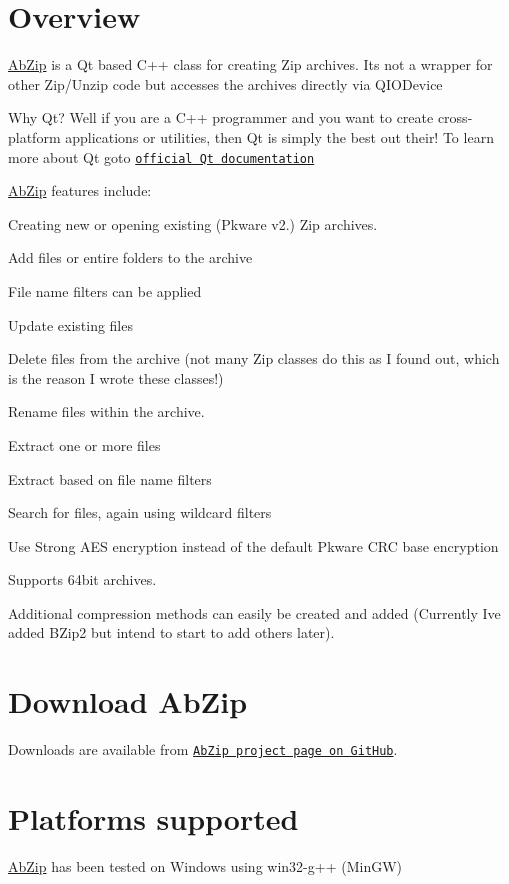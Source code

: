 \hypertarget{index_overview}{}\section{Overview}\label{index_overview}
\hyperlink{class_ab_zip}{Ab\+Zip} is a Qt based C++ class for creating Zip archives. It\textquotesingle{}s not a wrapper for other Zip/\+Unzip code but accesses the archives directly via Q\+I\+O\+Device

Why Qt? Well if you are a C++ programmer and you want to create cross-\/platform applications or utilities, then Qt is simply the best out their! To learn more about Qt goto \href{http://qt-project.org/doc/}{\tt official Qt documentation}

\hyperlink{class_ab_zip}{Ab\+Zip} features include\+:
\begin{DoxyItemize}
\item Creating new or opening existing (Pkware v2.) Zip archives.
\item Add files or entire folders to the archive
\item File name filters can be applied
\item Update existing files
\item Delete files from the archive (not many Zip classes do this as I found out, which is the reason I wrote these classes!)
\item Rename files within the archive.
\item Extract one or more files
\item Extract based on file name filters
\item Search for files, again using wildcard filters
\item Use Strong A\+ES encryption instead of the default Pkware C\+RC base encryption
\item Supports 64bit archives.
\item Additional compression methods can easily be created and added (Currently I\textquotesingle{}ve added B\+Zip2 but intend to start to add others later).
\end{DoxyItemize}\hypertarget{index_download}{}\section{Download Ab\+Zip}\label{index_download}
Downloads are available from \href{https://github.com/abelayer/AbZip}{\tt Ab\+Zip project page on Git\+Hub}.\hypertarget{index_platforms}{}\section{Platforms supported}\label{index_platforms}
\hyperlink{class_ab_zip}{Ab\+Zip} has been tested on Windows using win32-\/g++ (Min\+GW)

